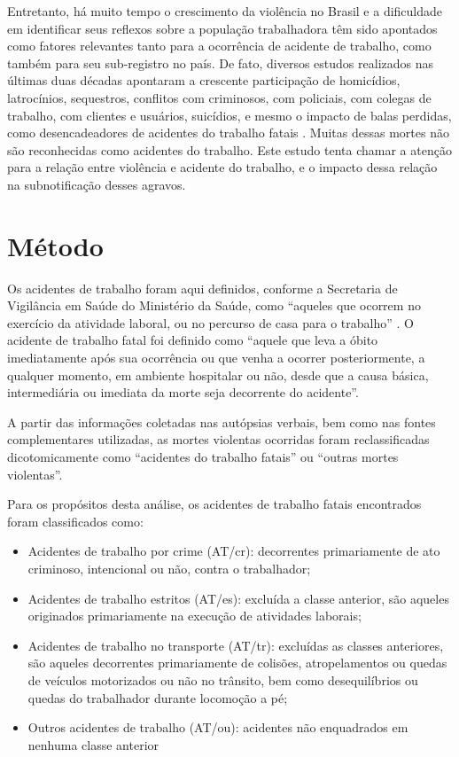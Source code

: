 Entretanto, há muito tempo o crescimento da violência no Brasil e a dificuldade em identificar seus reflexos sobre a população trabalhadora têm sido apontados como fatores relevantes tanto para a ocorrência de acidente de trabalho, como também para seu sub-registro no país. De fato, diversos estudos realizados nas últimas duas décadas apontaram a crescente participação de homicídios, latrocínios, sequestros, conflitos com criminosos, com policiais, com colegas de trabalho, com clientes e usuários, suicídios, e mesmo o impacto de balas perdidas, como desencadeadores de acidentes do trabalho fatais \citep{oliveira1997acidentes, mendes2003verso, CordeiroTrab, machado1994acidentes, waldvogel1999acidentes, paes2002assaltantes, hennington2004trabalho, santana2013fatal, drumond2013avaliaccao, lacerda2014acidentes, cordeiro2017violencia}. Muitas dessas mortes não são reconhecidas como acidentes do trabalho. Este estudo tenta chamar a atenção para a relação entre violência e acidente do trabalho, e o impacto dessa relação na subnotificação desses agravos.

\section{Método}

Os acidentes de trabalho foram aqui definidos, conforme a Secretaria de Vigilância em Saúde do Ministério da Saúde, como “aqueles que ocorrem no exercício da atividade laboral, ou no percurso de casa para o trabalho” \citep[pg. 753]{ministerio2019guia}. O acidente de trabalho fatal foi definido como “aquele que leva a óbito imediatamente após sua ocorrência ou que venha a ocorrer posteriormente, a qualquer momento, em ambiente hospitalar ou não, desde que a causa básica, intermediária ou imediata da morte seja decorrente do acidente”\citep[pg. 753]{ministerio2019guia}.

A partir das informações coletadas nas autópsias verbais, bem como nas fontes complementares utilizadas, as mortes violentas ocorridas foram reclassificadas dicotomicamente como “acidentes do trabalho fatais” ou “outras mortes violentas”.

Para os propósitos desta análise, os acidentes de trabalho fatais encontrados foram classificados como:

\begin{itemize}
    \item Acidentes de trabalho por crime (AT/cr): decorrentes primariamente de ato criminoso, intencional ou não, contra o trabalhador;
    \item Acidentes de trabalho estritos (AT/es): excluída a classe anterior, são aqueles originados primariamente na execução de atividades laborais;
    \item Acidentes de trabalho no transporte (AT/tr): excluídas as classes anteriores, são aqueles decorrentes primariamente de colisões, atropelamentos ou quedas de veículos motorizados ou não no trânsito, bem como desequilíbrios ou quedas do trabalhador durante locomoção a pé;
    \item Outros acidentes de trabalho (AT/ou): acidentes não enquadrados em nenhuma classe anterior
\end{itemize}

